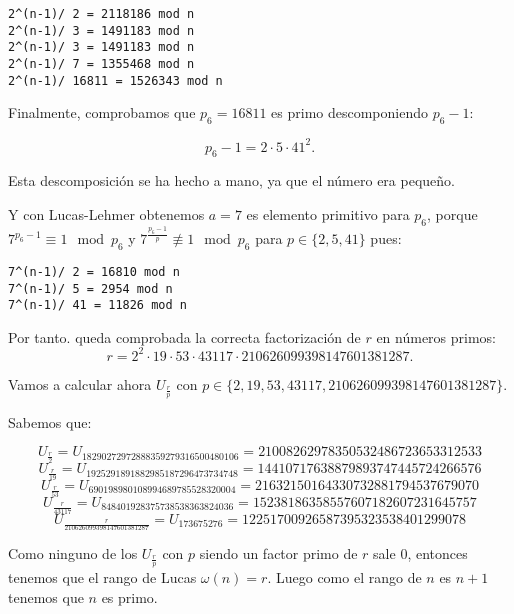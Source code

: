 \documentclass[a4paper]{article}
\begin{document}
\begin{verbatim}
2^(n-1)/ 2 = 2118186 mod n
2^(n-1)/ 3 = 1491183 mod n
2^(n-1)/ 3 = 1491183 mod n
2^(n-1)/ 7 = 1355468 mod n
2^(n-1)/ 16811 = 1526343 mod n
\end{verbatim}

Finalmente, comprobamos que $p_6=16811$ es primo descomponiendo $p_6-1$:

$$p_6-1=2\cdot 5\cdot 41^2.$$

Esta descomposición se ha hecho a mano, ya que el número era pequeño.

Y con Lucas-Lehmer obtenemos $a=7$ es elemento primitivo para $p_6$, porque $7^{p_6-1}\equiv 1\mod p_6$ y $7^{\frac{p_6-1}{p}}\not\equiv 1\mod p_6 $ para $p\in\{2, 5, 41\}$ pues:

\begin{verbatim}
7^(n-1)/ 2 = 16810 mod n
7^(n-1)/ 5 = 2954 mod n
7^(n-1)/ 41 = 11826 mod n
\end{verbatim}

Por tanto. queda comprobada la correcta factorización de $r$ en números primos:
$$r=2^2\cdot 19\cdot 53\cdot 43117\cdot 210626099398147601381287.$$

Vamos a calcular ahora $U_{\frac{r}{p}}$ con $p\in\{2,19,53,43117,210626099398147601381287\}$.

Sabemos que:

$$U_{\frac{r}{2}} = U_{18290272972888359279316500480106}=21008262978350532486723653312533$$
$$U_{\frac{r}{19}} = U_{1925291891882985187296473734748}=14410717638879893747445724266576$$
$$U_{\frac{r}{53}} = U_{690198980108994689785528320004}=21632150164330732881794537679070$$
$$U_{\frac{r}{43117}} = U_{848401928375738538363824036}=15238186358557607182607231645757$$
$$U_{\frac{r}{210626099398147601381287}} = U_{173675276}=12251700926587395323538401299078$$

Como ninguno de los $U_{\frac{r}{p}}$ con $p$ siendo un factor primo de $r$ sale 0, entonces tenemos que el rango de Lucas $\omega (n)=r$. Luego como el rango de $n$ es $n+1$ tenemos que $n$ es primo.
\end{document}
